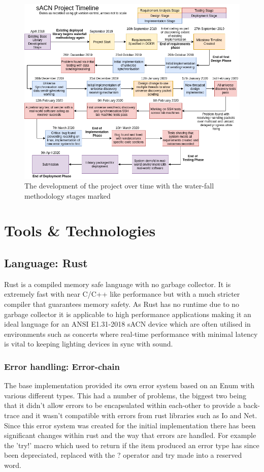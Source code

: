 \documentclass[11pt,a4paper]{report}
\begin{document}
\begin{figure}[H]
\label{project_dev_timeline}
\includegraphics[width=\textwidth]{CS4099-dev-timeline}
\caption{The development of the project over time with the water-fall methodology stages marked}
\end{figure}


\section{Tools \& Technologies}
\subsection{Language: Rust}
Rust \cite{RUST_LANG} is a compiled memory safe language with no garbage collector. It is extremely fast with near C/C++ like performance \cite{RUST_C_COMPARISON} but with a much stricter compiler that guarantees memory safety. As Rust has no runtime due to no garbage collector it is applicable to high performance applications making it an ideal language for an ANSI E1.31-2018 sACN device which are often utilised in environments such as concerts where real-time performance with minimal latency is vital to keeping lighting devices in sync with sound.

\subsubsection{Error handling: Error-chain}
The base implementation provided its own error system based on an Enum with various different types. This had a number of problems, the biggest two being that it didn't allow errors to be encapsulated within each-other to provide a back-trace and it wasn't compatible with errors from rust libraries such as Io and Net. Since this error system was created for the initial implementation there has been significant changes within rust and the way that errors are handled. For example the 'try!' \cite{RUST_TRY} macro which used to return if the item produced an error type has since been depreciated, replaced with the ? operator and try made into a reserved word.\\
\end{document}
